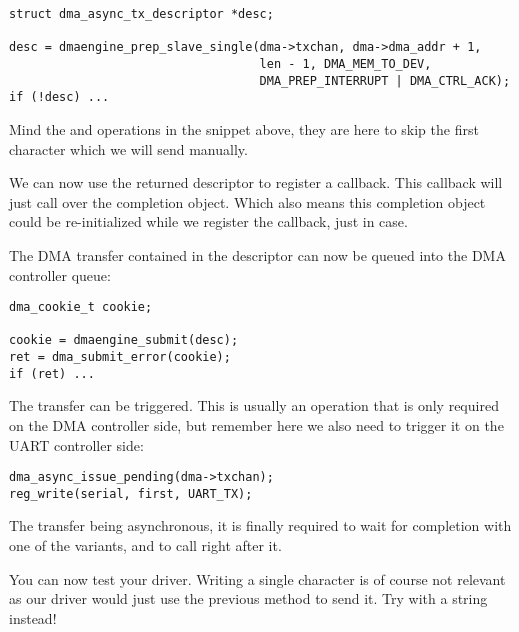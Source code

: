 \begin{verbatim}
struct dma_async_tx_descriptor *desc;

desc = dmaengine_prep_slave_single(dma->txchan, dma->dma_addr + 1,
                                   len - 1, DMA_MEM_TO_DEV,
                                   DMA_PREP_INTERRUPT | DMA_CTRL_ACK);
if (!desc) ...
\end{verbatim}

Mind the  and  operations in the snippet above, they are
here to skip the first character which we will send manually.

We can now use the returned descriptor to register a callback. This callback
will just call  over the completion object. Which also means
this completion object could be re-initialized while we register the callback,
just in case.

The DMA transfer contained in the descriptor can now be queued into the DMA
controller queue:

\begin{verbatim}
dma_cookie_t cookie;

cookie = dmaengine_submit(desc);
ret = dma_submit_error(cookie);
if (ret) ...
\end{verbatim}

The transfer can be triggered. This is usually an operation that is only
required on the DMA controller side, but remember here we also need to trigger
it on the UART controller side:

\begin{verbatim}
dma_async_issue_pending(dma->txchan);
reg_write(serial, first, UART_TX);
\end{verbatim}

The transfer being asynchronous, it is finally required to wait for completion
with one of the  variants, and to call
 right after it.

You can now test your driver. Writing a single character is of course not
relevant as our driver would just use the previous method to send it. Try with
a string instead!

